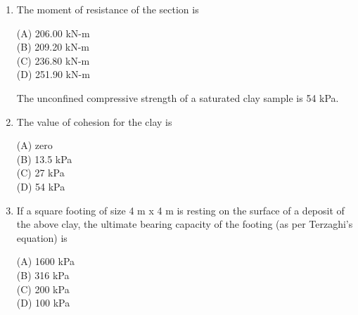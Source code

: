 \documentclass[journal,12pt,onecolumn]{exam}
\theoremstyle{remark}
\begin{document}
\begin{enumerate}
\setlength{\parskip}{0.5cm}

\hfill{}

\begin{multicols}{4}
\noindent(A) 205.30 mm\\
(B) 184.56 mm\\
(C) 160.91 mm\\
(D) 145.30 mm
\end{multicols}

\setlength{\parskip}{0.5cm}
\noindent\item The moment of resistance of the section is

\setlength{\parskip}{0.5cm}

\hfill{}

\begin{multicols}{4}
\noindent(A) 206.00 kN-m\\
(B) 209.20 kN-m\\
(C) 236.80 kN-m\\
(D) 251.90 kN-m
\end{multicols}

\setlength{\parskip}{0.5cm}


The unconfined compressive strength of a saturated clay sample is 54 kPa.

\setlength{\parskip}{0.5cm}

\noindent\item The value of cohesion for the clay is

\setlength{\parskip}{0.5cm}

\hfill{}

\begin{multicols}{4}
\noindent(A) zero\\
(B) 13.5 kPa\\
(C) 27 kPa\\
(D) 54 kPa
\end{multicols}

\setlength{\parskip}{0.5cm}
\noindent\item If a square footing of size 4 m x 4 m is resting on the surface of a deposit of the above clay, the ultimate bearing capacity of the footing (as per Terzaghi’s equation) is

\setlength{\parskip}{0.5cm}

\hfill{}

\begin{multicols}{4}
\noindent(A) 1600 kPa\\
(B) 316 kPa\\
(C) 200 kPa\\
(D) 100 kPa
\end{multicols}



\end{enumerate}
\end{document}
